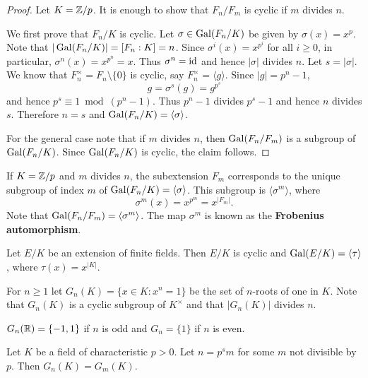 \begin{proof}
    Let $K=\mathbb{Z}/p$. It is enough to show that $F_n/F_m$ is cyclic if $m$ divides $n$. 
    
    We first prove that $F_n/K$ is cyclic. Let $\sigma\in\operatorname{Gal}(F_n/K)$ be given by $\sigma(x)=x^p$. 
    Note that $|\operatorname{Gal}(F_n/K)|=[F_n:K]=n$. Since 
    $\sigma^i(x)=x^{p^i}$ for all $i\geq 0$, in particular, 
    $\sigma^n(x)=x^{p^n}=x$. Thus $\sigma^n=\operatorname{id}$ and hence $|\sigma|$ divides $n$. Let 
    $s=|\sigma|$. We know that $F_n^{\times}=F_n\setminus\{0\}$ is
    cyclic, say $F_n^{\times}=\langle g\rangle$. Since $|g|=p^n-1$, 
    \[
    g=\sigma^s(g)=g^{p^s}
    \]
    and hence $p^s\equiv 1\bmod (p^n-1)$. Thus $p^n-1$ divides $p^s-1$ and
    hence $n$ divides $s$. Therefore $n=s$ and $\operatorname{Gal}(F_n/K)=\langle\sigma\rangle$. 
    
    For the general case note that if $m$ divides $n$, 
    then $\operatorname{Gal}(F_n/F_m)$ is a subgroup of $\operatorname{Gal}(F_n/K)$. Since  $\operatorname{Gal}(F_n/K)$ is cyclic, 
    the claim follows.
\end{proof}

If $K=\mathbb{Z}/p$ and 
$m$ divides $n$, the subextension $F_m$ corresponds 
to the unique
subgroup of index $m$ of $\operatorname{Gal}(F_n/K)=\langle\sigma\rangle$. This subgroup
is $\langle\sigma^m\rangle$, where
\[
\sigma^m(x)=x^{p^m}=x^{|F_m|}.
\]
Note that $\operatorname{Gal}(F_n/F_m)=\langle\sigma^m\rangle$. 
The map $\sigma^m$ is known as 
the \textbf{Frobenius automorphism}. 

\begin{exercise}
    Let $E/K$ be an extension of finite fields. Then $E/K$ 
    is cyclic and $\operatorname{Gal}(E/K)=\langle\tau\rangle$, where $\tau(x)=x^{|K|}$. 
\end{exercise}





For $n\geq1$ let $G_n(K)=\{x\in K:x^n=1\}$ be the 
set of $n$-roots of one in $K$. Note that
$G_n(K)$ is a cyclic subgroup of $K^{\times}$ and that 
$|G_n(K)|$ divides $n$. 

\begin{example}
    $G_n(\mathbb{R})=\{-1,1\}$ if $n$ is odd and $G_{n}=\{1\}$ if $n$ is even.
\end{example}

\begin{exercise}
    Let $K$ be a field of characteristic $p>0$. Let $n=p^sm$ for some $m$ not divisible by $p$. 
    Then $G_n(K)=G_m(K)$. 
\end{exercise}

